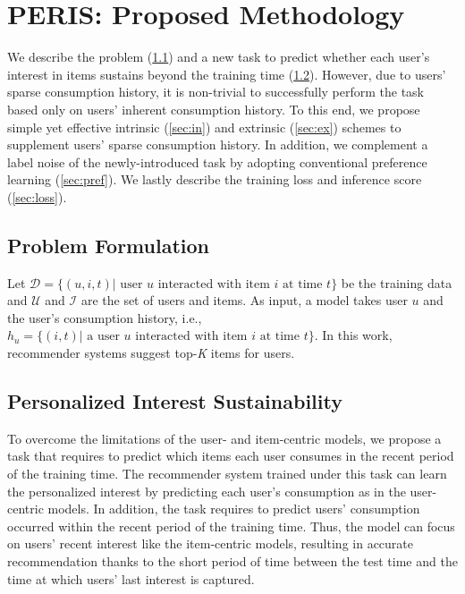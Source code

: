 \documentclass[sigconf]{acmart}
\begin{document}
\section{PERIS: Proposed Methodology}
We describe the problem (\cref{sec:probform}) and a new task to predict whether each user's interest in items sustains beyond the training time (\cref{sec:pis}). However, due to users' sparse consumption history, it is non-trivial to successfully perform the task based only on users' inherent consumption history. To this end, we propose simple yet effective intrinsic (\cref{sec:in}) and extrinsic (\cref{sec:ex}) schemes to supplement users' sparse consumption history. In addition, we complement a label noise of the newly-introduced task by adopting conventional preference learning (\cref{sec:pref}). We lastly describe the training loss and inference score (\cref{sec:loss}). 


\subsection{Problem Formulation}
\label{sec:probform}
Let $ \mathcal{D} = \{(u, i, t)| \text{ user } u \text{ interacted with item } i \text{ at time } t\} $ be the training data and $\mathcal{U}$ and $\mathcal{I}$ are the set of users and items.
As input, a model takes user $u$ and the user's consumption history, i.e., $h_u = \{(i, t) | \text{ a user } u \text{ interacted with item } i \text{ at time } t\}$. 
In this work, recommender systems suggest top-\textit{K} items for users. 

\subsection{Personalized Interest Sustainability}
\label{sec:pis}

To overcome the limitations of the user- and item-centric models, we propose a task that requires to predict which items each user consumes in the recent period of the training time. The recommender system trained under this task can learn the personalized interest by predicting each user's consumption as in the user-centric models. In addition, the task requires to predict users' consumption occurred within the recent period of the training time. Thus, the model can focus on users' recent interest like the item-centric models, resulting in accurate recommendation thanks to the short period of time between the test time and the time at which users' last interest is captured. 
\end{document}
